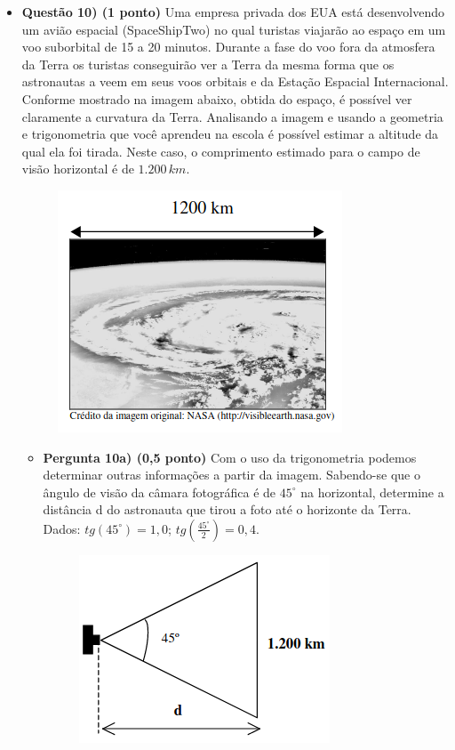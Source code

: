 \documentclass[a4paper, 12pt]{article}
\begin{document}
\begin{flushleft}
\begin{itemize}
            \item \textbf{Questão 10) (1 ponto)} Uma empresa privada dos EUA está desenvolvendo um avião espacial (SpaceShipTwo) no qual turistas viajarão ao espaço em um voo suborbital de 15 a 20 minutos. Durante a fase do voo fora da atmosfera da Terra os turistas conseguirão ver a Terra da mesma forma que os astronautas a veem em seus voos orbitais e da Estação Espacial Internacional. Conforme mostrado na imagem abaixo, obtida do espaço, é possível ver claramente a curvatura da Terra. Analisando a imagem e usando a geometria e trigonometria que você aprendeu na escola é possível estimar a altitude da qual ela foi tirada. Neste caso, o comprimento estimado para o campo de visão horizontal é de $1.200 \, km$.
                \begin{figure}[H]
                    \centering
                    \includegraphics[scale=0.5]{img/10.png}
                \end{figure}
                \begin{itemize}
                    \item \textbf{Pergunta 10a) (0,5 ponto)} Com o uso da trigonometria podemos determinar outras informações a partir da imagem. Sabendo-se que o ângulo de visão da câmara fotográfica é de $45^{\circ}$ na horizontal, determine a distância d do astronauta que tirou a foto até o horizonte da Terra. Dados: $tg(45^{\circ}) = 1,0$; $tg \left(\frac{45^{\circ}}{2}\right) = 0,4$.
                        \begin{figure}[H]
                            \centering
                            \includegraphics[scale=0.5]{img/10a.png}

\end{figure}
\end{itemize}
\end{itemize}
\end{flushleft}
\end{document}
